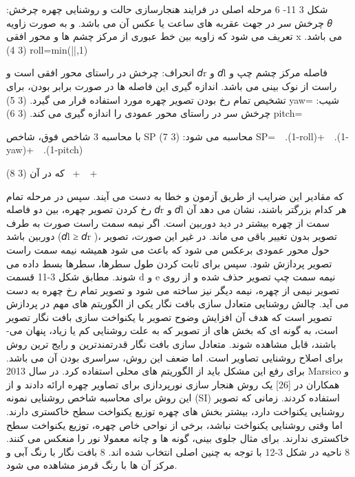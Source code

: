 شکل ‏3 11- 6 مرحله اصلی در فرایند هنجارسازی حالت و روشنایی چهره
چرخش: چرخش سر در جهت عقربه های ساعت یا عکس آن می باشد. و به صورت زاویه 𝜃 تعریف می شود که زاویه بین خط عبوری از مرکز چشم ها و محور افقی x می باشد.
(‏3 4)
roll=min(\left|\frac{2\theta}{\pi}\right|,1)	

انحراف: چرخش در راستای محور افقی است و 𝑑r و 𝑑l فاصله مرکز چشم چپ و راست از نوک بینی می باشد. اندازه گیری این فاصله ها در صورت برابر بودن، برای تشخیص تمام رخ بودن تصویر چهره مورد استفاده قرار می گیرد.
(‏3 5)
yaw=	
شیب: چرخش سر در راستای محور عمودی را اندازه گیری می کند.
(‏3 6)
pitch=	

با محاسبه 3 شاخص فوق، شاخص SP محاسبه می شود:
(‏3 7)
SP=\ \alpha\ .(1-roll)+\ \beta\ .(1-yaw)+\ \gamma\ .(1-pitch)	

که در آن
(‏3 8)
\alpha\ +\ \beta\ +\ 	

که مقادیر این ضرایب از طریق آزمون و خطا به دست می آیند. سپس در مرحله تمام رخ کردن تصویر چهره، بین دو فاصله 𝑑r و 𝑑l هر کدام بزرگتر باشند، نشان می دهد آن سمت از چهره بیشتر در دید دوربین است. اگر نیمه سمت راست صورت به طرف دوربین باشد (𝑑l ≥ 𝑑r )، تصویر بدون تغییر باقی می ماند. در غیر این صورت، تصویر حول محور عمودی برعکس می شود که باعث می شود همیشه نیمه سمت راست تصویر پردازش شود. سپس برای ثابت کردن طول سطرها، سطرها بسط داده می شوند. مطابق شکل 3-11 قسمت d و e نیمه سمت چپ تصویر حذف شده و از روی تصویر نیمی از چهره، نیمه دیگر نیز ساخته می شود و تصویر تمام رخ چهره به دست می آید.
	چالش روشنایی
متعادل سازی بافت نگار یکی از الگوریتم های مهم در پردازش تصویر است که هدف آن افزایش وضوح تصویر با یکنواخت سازی بافت نگار تصویر است، به گونه ای که بخش های از تصویر که به علت روشنایی کم یا زیاد، پنهان می-باشند، قابل مشاهده شوند. متعادل سازی بافت نگار قدرتمندترین و رایج ترین روش برای اصلاح روشنایی تصاویر است. اما ضعف این روش، سراسری بودن آن می باشد. برای رفع این مشکل باید از الگوریتم های محلی استفاده کرد.
در سال 2013 Marsico و همکاران در [26] یک روش هنجار سازی نورپردازی برای تصاویر چهره ارائه دادند و از این روش برای محاسبه شاخص روشنایی نمونه  (SI) استفاده کردند. زمانی که تصویر روشنایی یکنواخت دارد، بیشتر بخش های چهره توزیع یکنواخت سطح خاکستری دارند. اما وقتی روشنایی یکنواخت نباشد، برخی از نواحی خاص چهره، توزیع یکنواخت سطح خاکستری ندارند. برای مثال جلوی بینی، گونه ها و چانه معمولا نور را منعکس می کنند. 8 ناحیه در شکل 3-12 با توجه به چنین اصلی انتخاب شده اند. 8 بافت نگار با رنگ آبی و مرکز آن ها با رنگ قرمز مشاهده می شود.
 
